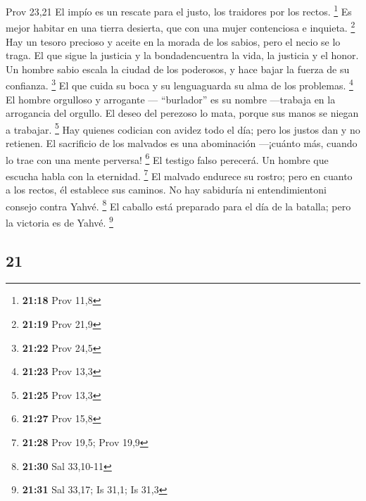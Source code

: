 \begin{paracol}{2}
{  Prov 23,21}  El impío es un rescate para el justo, los
traidores por los rectos. \footnote{\textbf{21:18} Prov 11,8}
 Es mejor habitar en una tierra desierta, que con una
mujer contenciosa e inquieta. \footnote{\textbf{21:19} Prov 21,9}
 Hay un tesoro precioso y aceite en la morada de los
sabios, pero el necio se lo traga.  El que sigue la
justicia y la bondadencuentra la vida, la justicia y el honor.
 Un hombre sabio escala la ciudad de los poderosos, y
hace bajar la fuerza de su confianza. \footnote{\textbf{21:22} Prov 24,5}
 El que cuida su boca y su lenguaguarda su alma de los
problemas. \footnote{\textbf{21:23} Prov 13,3}  El hombre
orgulloso y arrogante --- ``burlador'' es su nombre ---trabaja en la
arrogancia del orgullo.  El deseo del perezoso lo mata,
porque sus manos se niegan a trabajar. \footnote{\textbf{21:25} Prov
  13,3}  Hay quienes codician con avidez todo el día;
pero los justos dan y no retienen.  El sacrificio de los
malvados es una abominación ---¡cuánto más, cuando lo trae con una mente
perversa! \footnote{\textbf{21:27} Prov 15,8}  El testigo
falso perecerá. Un hombre que escucha habla con la eternidad.
\footnote{\textbf{21:28} Prov 19,5; Prov 19,9}  El
malvado endurece su rostro; pero en cuanto a los rectos, él establece
sus caminos.  No hay sabiduría ni entendimientoni consejo
contra Yahvé. \footnote{\textbf{21:30} Sal 33,10-11}  El
caballo está preparado para el día de la batalla; pero la victoria es de
Yahvé. \footnote{\textbf{21:31} Sal 33,17; Is 31,1; Is 31,3}

\switchcolumn
\begin{otherlanguage}{english}

\hypertarget{section-41}{%
\section{21}\label{section-41}}


\end{otherlanguage}
\end{paracol}
